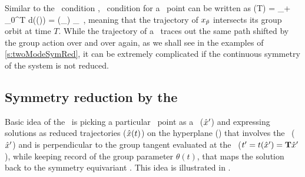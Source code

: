\documentclass[aip,cha,
reprint,
secnumarabic,
nofootinbib, tightenlines,
nobibnotes, showkeys, showpacs,
groupedaddress,
]{revtex4-1}
\begin{document}
Similar to the \reqv\ condition , \rpo\ condition for a \statesp\ point can be written as
\beq
  \ssp (T) = \ssp_\rpprime  + \int_0^T d\tau \vel(\ssp (\tau)) = \LieEl (\theta_\rpprime ) \ssp_\rpprime
  \,,
meaning that the trajectory of $x_{\tilde{p}}$ intersects its group orbit at
time $T$. While the trajectory of a \rpo\ traces out the same path shifted
by the group action over and over again, as we shall see in the examples of
\ref{s:twoModeSymRed}, it can be extremely complicated if the continuous
symmetry of the system is not reduced.

\subsection{Symmetry reduction by the \mslices}
\label{s:slice}

Basic idea of the \mslices\ is picking a particular \statesp\ point as a \template\
(${\hat{x}'}$) and expressing solutions as reduced trajectories ($\hat{x} (t)$) on the hyperplane
(\pSRed) that involves the \template\ (${\hat{x}'}$) and is perpendicular to the group
tangent evaluated at the \template\ ($t'_{} = t({\hat{x}'}) = \mathbf{T} {\hat{x}'}$),
while keeping record of the group parameter $\theta (t)$, that maps the solution
back to the symmetry equivariant \statesp . This idea is illustrated in .
\end{document}
